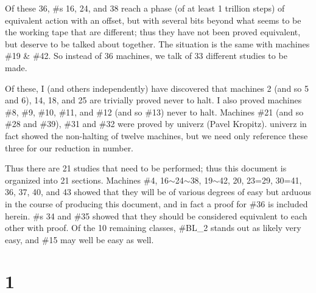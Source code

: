 \documentclass[12pt]{article}
\begin{document}
Of these 36, \#s 16, 24, and 38 reach a phase (of at least 1 trillion steps) of equivalent action with an offset, but with several bits beyond what seems to be the working tape that are different; thus they have not been proved equivalent, but deserve to be talked about together. The situation is the same with machines \#19 \& \#42. So instead of 36 machines, we talk of 33 different studies to be made.

Of these, I (and others independently) have discovered that machines 2 (and so 5 and 6), 14, 18, and 25 are trivially proved never to halt. I also proved machines \#8, \#9, \#10, \#11, and \#12 (and so \#13) never to halt. Machines \#21 (and so \#28 and \#39), \#31 and \#32 were proved by univerz (Pavel Kropitz). univerz in fact showed the non-halting of twelve machines, but we need only reference these three for our reduction in number.

Thus there are 21 studies that need to be performed; thus this document is organized into 21 sections.
Machines \#4, 16$\sim$24$\sim$38, 19$\sim$42, 20, 23=29, 30=41, 36, 37, 40, and 43
showed that they will be of various degrees of easy but arduous in the course of producing this document,
and in fact a proof for \#36 is included herein.
\#s 34 and \#35 showed that they should be considered equivalent to each other with proof.
Of the 10 remaining classes, \#BL\_2 stands out as likely very easy, and \#15 may well be easy as well.


\newpage
\tableofcontents
\clearpage
{}
{}
\section*{1}
\end{document}

